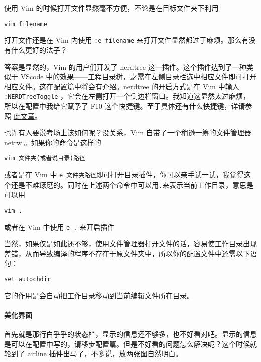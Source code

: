 使用 Vim 的时候打开文件显然毫不方便，不论是在目标文件夹下利用

\begin{verbatim}
vim filename
\end{verbatim}

打开文件还是在 Vim 内使用 \texttt{:e filename} 来打开文件显然都过于麻烦。那么有没有什么更好的法子？

答案是显然的，Vim 的用户们开发了 nerdtree 这一插件。这个插件达到了一种类似于 VScode 中的效果——工程目录树，之需在左侧目录栏选中相应文件即可打开相应文件。这在配置篇中将会有介绍。nerdtree 的开启方式是在 Vim 中输入 \texttt{:NERDTreeToggle} ，它会在左侧打开一个侧边栏窗口。我知道这显然太过麻烦，所以在配置中我给它赋予了 F10 这个快捷键。至于具体还有什么快捷键，详请参照 \href{[http://yang3wei.github.io/blog/2013/01/29/nerdtree-kuai-jie-jian-ji-lu/}{此文章}。

也许有人要说考场上该如何呢？没关系，Vim 自带了一个稍逊一筹的文件管理器 netrw 。如果你的命令是这样的

\begin{verbatim}
vim 文件夹(或者说目录)路径
\end{verbatim}

或者是在 Vim 中 \texttt{e 文件夹路径}即可打开目录插件，你可以亲手试一试，我觉得这个还是不难琢磨的。同时在上述两个命令中可以用\texttt{.}来表示当前工作目录，意思是可以用

\begin{verbatim}
vim .
\end{verbatim}

或者在 Vim 中使用 \texttt{e .} 来开启插件

当然，如果仅是如此还不够，使用文件管理器打开文件的话，容易使工作目录出现差错，从而导致编译的程序不存在于原文件夹中，所以你的配置文件中还需以下语句：

\begin{verbatim}
set autochdir
\end{verbatim}

它的作用是会自动把工作目录移动到当前编辑文件所在目录。

\paragraph{美化界面}

首先就是那行白乎乎的状态栏，显示的信息还不够多，也不好看对吧。显示的信息是可以在配置中写的，请移步配置篇。但是不好看的问题怎么解决呢？这个时候就轮到了 airline 插件出马了，不多说，放两张图自然明白。

